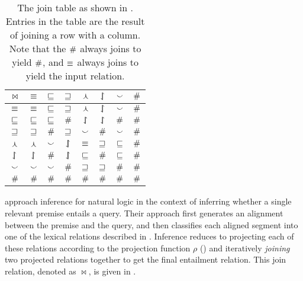 
\begin{table}[t]
	\begin{center}
	\begin{tabular}{|c||c|c|c|c|c|c|c|}
    \hline
    $\bowtie$ & $\equiv$ & $\sqsubseteq$ & $\sqsupseteq$ & $\curlywedge$ & $\downharpoonleft\hspace{-1.25mm}\upharpoonright$ & $\smallsmile$ & $\#$ \\
    \hline
    $\equiv$ & $\equiv$ & $\sqsubseteq$ & $\sqsupseteq$ & $\curlywedge$ & $\downharpoonleft\hspace{-1.25mm}\upharpoonright$ & $\smallsmile$ & $\#$ \\
    $\sqsubseteq$ & $\sqsubseteq$ & $\sqsubseteq$ & $\#$ & $\downharpoonleft\hspace{-1.25mm}\upharpoonright$ & $\downharpoonleft\hspace{-1.25mm}\upharpoonright$ & $\#$ & $\#$ \\
    $\sqsupseteq$ & $\sqsupseteq$ & $\#$ & $\sqsupseteq$ & $\smallsmile$ & $\#$ & $\smallsmile$ & $\#$  \\
    $\curlywedge$ & $\curlywedge$ & $\smallsmile$ & $\downharpoonleft\hspace{-1.25mm}\upharpoonright$ & $\equiv$ & $\sqsupseteq$ & $\sqsubseteq$ & $\#$  \\
    $\downharpoonleft\hspace{-1.25mm}\upharpoonright$ & $\downharpoonleft\hspace{-1.25mm}\upharpoonright$ & $\#$ & $\downharpoonleft\hspace{-1.25mm}\upharpoonright$ & $\sqsubseteq$ & $\#$ & $\sqsubseteq$ & $\#$  \\
    $\smallsmile$ & $\smallsmile$ & $\smallsmile$ & $\#$ & $\sqsupseteq$ & $\sqsupseteq$ & $\#$ & $\#$  \\
    $\#$ & $\#$ & $\#$ & $\#$ & $\#$ & $\#$ & $\#$ & $\#$ \\
    \hline
	\end{tabular}
	\caption{
    The join table as shown in .
    Entries in the table are the result of joining a row with a
      column.
    Note that the $\#$ always joins to yield $\#$,
    and $\equiv$ always joins to yield the input relation.
		\label{tab:join}
	}
	\end{center}
\end{table}

 approach inference for natural logic in
  the context of inferring whether a single relevant premise entails
  a query.
Their approach first generates an alignment between the premise
  and the query, and then classifies each aligned segment into one of
  the lexical relations described in .
Inference reduces to projecting each of these relations
  according to the projection function $\rho$ ()
  and iteratively \textit{joining}  two projected relations together to 
  get the final entailment relation.
This join relation, denoted as $\bowtie$, is given in .

